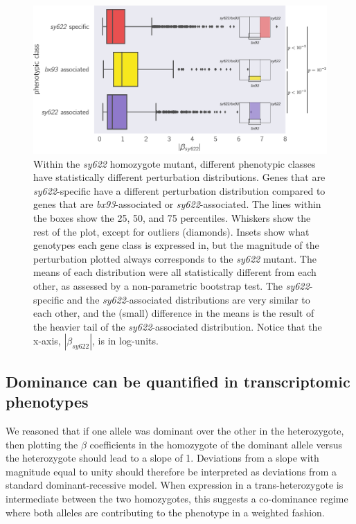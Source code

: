 \documentclass[10pt, onecolumn]{article}
\begin{document}
\begin{figure}
  \centering{}
  \includegraphics[width=.7\textwidth]{../figs/dpy22_classes.pdf}
  \caption{
    Within the \emph{sy622} homozygote mutant, different phenotypic classes have
    statistically different perturbation distributions. Genes that are
    \emph{sy622}-specific have a different perturbation distribution compared to
    genes that are \emph{bx93}-associated or \emph{sy622}-associated. The lines
    within the boxes show the 25, 50, and 75 percentiles. Whiskers show the rest
    of the plot, except for outliers (diamonds). Insets show what genotypes each
    gene class is expressed in, but the magnitude of the perturbation plotted
    always corresponds to the \emph{sy622} mutant. The means of each
    distribution were all statistically different from each other, as assessed
    by a non-parametric bootstrap test. The \emph{sy622}-specific and the
    \emph{sy622}-associated distributions are very similar to each other, and
    the (small) difference in the means is the result of the heavier tail of the
    \emph{sy622}-associated distribution. Notice that the x-axis,
    $|\beta_{sy622}|$, is in log-units.
  }
\label{fig:classes}
\end{figure}

\subsection*{Dominance can be quantified in transcriptomic phenotypes}
We reasoned that if one allele was dominant over the other in the heterozygote,
then plotting the $\beta$ coefficients in the homozygote of the dominant allele
versus the heterozygote should lead to a slope of 1. Deviations from a slope
with magnitude equal to unity should therefore be interpreted as deviations from
a standard dominant-recessive model. When expression in a trans-heterozygote
is intermediate between the two homozygotes, this suggests a co-dominance regime
where both alleles are contributing to the phenotype in a weighted fashion.
\end{document}
